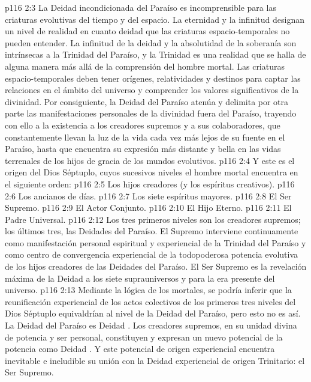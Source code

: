 \vs p116 2:3 \pc La Deidad incondicionada del Paraíso es incomprensible para las criaturas evolutivas del tiempo y del espacio. La eternidad y la infinitud designan un nivel de realidad en cuanto deidad que las criaturas espacio\hyp{}temporales no pueden entender. La infinitud de la deidad y la absolutidad de la soberanía son intrínsecas a la Trinidad del Paraíso, y la Trinidad es una realidad que se halla de alguna manera más allá de la comprensión del hombre mortal. Las criaturas espacio\hyp{}temporales deben tener orígenes, relatividades y destinos para captar las relaciones en el ámbito del universo y comprender los valores significativos de la divinidad. Por consiguiente, la Deidad del Paraíso atenúa y delimita por otra parte las manifestaciones personales de la divinidad fuera del Paraíso, trayendo con ello a la existencia a los creadores supremos y a sus colaboradores, que constantemente llevan la luz de la vida cada vez más lejos de su fuente en el Paraíso, hasta que encuentra su expresión más distante y bella en las vidas terrenales de los hijos de gracia de los mundos evolutivos.
\vs p116 2:4 Y este es el origen del Dios Séptuplo, cuyos sucesivos niveles el hombre mortal encuentra en el siguiente orden:
\vs p116 2:5 Los hijos creadores (y los espíritus creativos).
\vs p116 2:6 Los ancianos de días.
\vs p116 2:7 Los siete espíritus mayores.
\vs p116 2:8 El Ser Supremo.
\vs p116 2:9 El Actor Conjunto.
\vs p116 2:10 El Hijo Eterno.
\vs p116 2:11 El Padre Universal.
\vs p116 2:12 \pc Los tres primeros niveles son los creadores supremos; los últimos tres, las Deidades del Paraíso. El Supremo interviene continuamente como manifestación personal espiritual y experiencial de la Trinidad del Paraíso y como centro de convergencia experiencial de la todopoderosa potencia evolutiva de los hijos creadores de las Deidades del Paraíso. El Ser Supremo es la revelación máxima de la Deidad a los siete suprauniversos y para la era presente del universo.
\vs p116 2:13 Mediante la lógica de los mortales, se podría inferir que la reunificación experiencial de los actos colectivos de los primeros tres niveles del Dios Séptuplo equivaldrían al nivel de la Deidad del Paraíso, pero esto no es así. La Deidad del Paraíso es Deidad . Los creadores supremos, en su unidad divina de potencia y ser personal, constituyen y expresan un nuevo potencial de la potencia como Deidad . Y este potencial de origen experiencial encuentra inevitable e ineludible su unión con la Deidad experiencial de origen Trinitario: el Ser Supremo.
